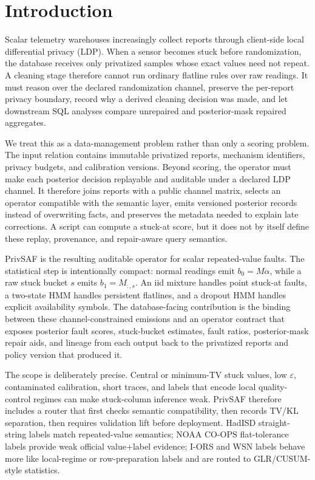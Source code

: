 \documentclass[conference]{IEEEtran}
\begin{document}
\section{Introduction}
\label{sec:introduction}

Scalar telemetry warehouses increasingly collect reports through client-side local differential privacy (LDP). When a sensor becomes stuck before randomization, the database receives only privatized samples whose exact values need not repeat. A cleaning stage therefore cannot run ordinary flatline rules over raw readings. It must reason over the declared randomization channel, preserve the per-report privacy boundary, record why a derived cleaning decision was made, and let downstream SQL analyses compare unrepaired and posterior-mask repaired aggregates.

We treat this as a data-management problem rather than only a scoring problem. The input relation contains immutable privatized reports, mechanism identifiers, privacy budgets, and calibration versions. Beyond scoring, the operator must make each posterior decision replayable and auditable under a declared LDP channel. It therefore joins reports with a public channel matrix, selects an operator compatible with the semantic layer, emits versioned posterior records instead of overwriting facts, and preserves the metadata needed to explain late corrections. A script can compute a stuck-at score, but it does not by itself define these replay, provenance, and repair-aware query semantics.

PrivSAF is the resulting auditable operator for scalar repeated-value faults. The statistical step is intentionally compact: normal readings emit \(b_0=M\alpha\), while a raw stuck bucket \(s\) emits \(b_1=M_{:,s}\). An iid mixture handles point stuck-at faults, a two-state HMM handles persistent flatlines, and a dropout HMM handles explicit availability symbols. The database-facing contribution is the binding between these channel-constrained emissions and an operator contract that exposes posterior fault scores, stuck-bucket estimates, fault ratios, posterior-mask repair aids, and lineage from each output back to the privatized reports and policy version that produced it.

The scope is deliberately precise. Central or minimum-TV stuck values, low \(\varepsilon\), contaminated calibration, short traces, and labels that encode local quality-control regimes can make stuck-column inference weak. PrivSAF therefore includes a router that first checks semantic compatibility, then records TV/KL separation, then requires validation lift before deployment. HadISD straight-string labels match repeated-value semantics; NOAA CO-OPS flat-tolerance labels provide weak official value+label evidence; I-ORS and WSN labels behave more like local-regime or row-preparation labels and are routed to GLR/CUSUM-style statistics.
\end{document}
